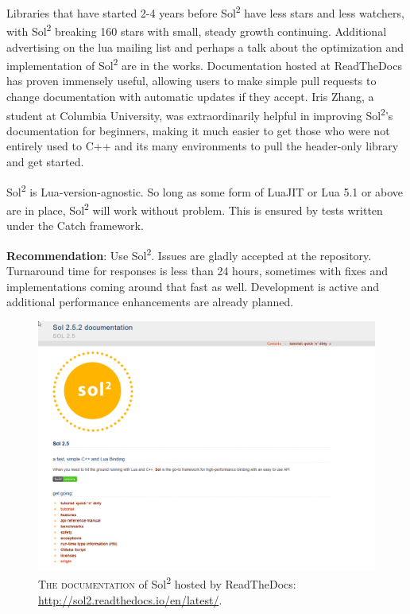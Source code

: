 \documentclass[conference,compsoc]{IEEEtran}
\newcommand{\soltwo}{Sol\textsuperscript{2}}
\begin{document}
Libraries that have started 2-4 years before \soltwo{} have less stars and less watchers, with \soltwo{} breaking 160 stars with small, steady growth continuing. Additional advertising on the lua mailing list and perhaps a talk about the optimization and implementation of \soltwo{} are in the works. Documentation hosted at ReadTheDocs\cite{readthedocs} has proven immensely useful, allowing users to make simple pull requests to change documentation with automatic updates if they accept. Iris Zhang, a student at Columbia University, was extraordinarily helpful in improving \soltwo{}'s documentation for beginners, making it much easier to get those who were not entirely used to C++ and its many environments to pull the header-only library and get started.

\soltwo{} is Lua-version-agnostic. So long as some form of LuaJIT or Lua 5.1 or above are in place, \soltwo{} will work without problem. This is ensured by tests written under the Catch\cite{catch} framework.

\textbf{Recommendation}: Use \soltwo{}. Issues are gladly accepted at the repository. Turnaround time for responses is less than 24 hours, sometimes with fixes and implementations coming around that fast as well. Development is active and additional performance enhancements are already planned.

\begin{figure}[ht]
\includegraphics[width=\textwidth]{docs}
\centering
\caption{\textsc{The documentation} of \soltwo{} hosted by ReadTheDocs: \url{http://sol2.readthedocs.io/en/latest/}.}
\label{fig:docs}
\end{figure}
\end{document}
